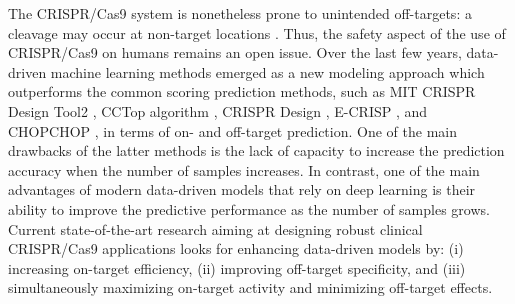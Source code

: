 \documentclass[unnumsec,webpdf,contemporary,large]{oup-authoring-template}
\theoremstyle{thmstyleone}%
\theoremstyle{thmstyletwo}%
\theoremstyle{thmstylethree}%
\begin{document}
The CRISPR/Cas9 system is nonetheless prone to unintended off-targets: a cleavage may occur at non-target locations \cite{zhang2015off, chen2017enhanced, kim2015digenome}. Thus, the safety aspect of the use of CRISPR/Cas9 on humans remains an open issue. %
Over the last few years, data-driven machine learning methods emerged as a new modeling approach which outperforms the common scoring prediction methods, such as MIT CRISPR Design Tool2 \cite{ran2013genome}, CCTop algorithm \cite{stemmer2015cctop}, CRISPR Design \cite{hsu2013dna}, E-CRISP \cite{heigwer2014crisp}, and CHOPCHOP \cite{montague2014chopchop}, in terms of on- and off-target prediction. One of the main drawbacks of the latter methods is the lack of capacity to increase the prediction accuracy when the number of samples increases. In contrast, one of the main advantages of modern data-driven models that rely on deep learning is their ability to improve the predictive performance as the number of samples grows. Current state-of-the-art research aiming at designing robust clinical CRISPR/Cas9 applications looks for enhancing data-driven models by: (i) increasing on-target efficiency, (ii) improving off-target specificity, and (iii) simultaneously maximizing on-target activity and minimizing off-target effects. 
\end{document}
